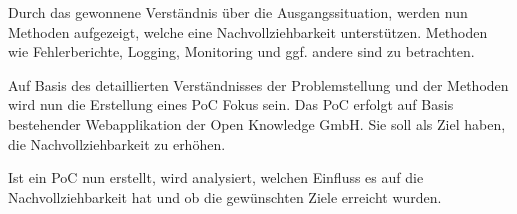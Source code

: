 Durch das gewonnene Verständnis über die Ausgangssituation, werden nun Methoden aufgezeigt, welche eine Nachvollziehbarkeit unterstützen. Methoden wie Fehlerberichte, Logging, Monitoring und ggf. andere sind zu betrachten.

Auf Basis des detaillierten Verständnisses der Problemstellung und der Methoden wird nun die Erstellung eines PoC Fokus sein. Das PoC erfolgt auf Basis bestehender Webapplikation der Open Knowledge GmbH. Sie soll als Ziel haben, die Nachvollziehbarkeit zu erhöhen.

Ist ein PoC nun erstellt, wird analysiert, welchen Einfluss es auf die Nachvollziehbarkeit hat und ob die gewünschten Ziele erreicht wurden.






